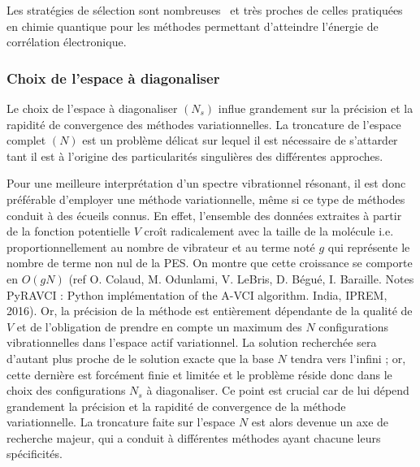 Les stratégies de sélection sont nombreuses~\cite{II-var-7,II-var-1,II-var-2,II-var-3,II-var-4,II-var-5} et très proches de celles pratiquées en chimie quantique pour les méthodes permettant d'atteindre l'énergie de corrélation électronique. 


\subsubsection*{Choix de l'espace à diagonaliser} 

Le choix de l'espace à diagonaliser $(N_s)$ influe grandement sur la précision et la rapidité de convergence des méthodes variationnelles. La troncature de l'espace complet $(N)$ est un problème délicat sur lequel il est nécessaire de s'attarder tant il est à l'origine des particularités singulières des différentes approches.

Pour une meilleure interprétation d'un spectre vibrationnel résonant, il est donc préférable d'employer une méthode variationnelle, même si ce type de méthodes conduit à des écueils connus. En effet, l'ensemble des données extraites à partir de la fonction potentielle $V$ croît radicalement avec la taille de la molécule i.e. proportionnellement au nombre de vibrateur et au terme noté $g$ qui représente le nombre de terme non nul de la PES. On montre que cette croissance se comporte en $O(gN)$ (ref O. Colaud, M. Odunlami, V. LeBris, D. Bégué, I. Baraille. Notes PyRAVCI : Python implémentation of the A-VCI algorithm. India, IPREM, 2016). Or, la précision de la méthode est entièrement dépendante de la qualité de $V$ et de l'obligation de prendre en compte un maximum des $N$ configurations vibrationnelles dans l’espace actif variationnel. La solution recherchée sera d'autant plus proche de le solution exacte que la base $N$ tendra vers l'infini ; or, cette dernière est forcément finie et limitée et le problème réside donc dans le choix des configurations $N_{s}$ à diagonaliser. Ce point est crucial car de lui dépend grandement la précision et la rapidité de convergence de la méthode variationnelle. La troncature faite sur l'espace $N$ est alors devenue un axe de recherche majeur, qui a conduit à différentes méthodes ayant chacune leurs spécificités.

